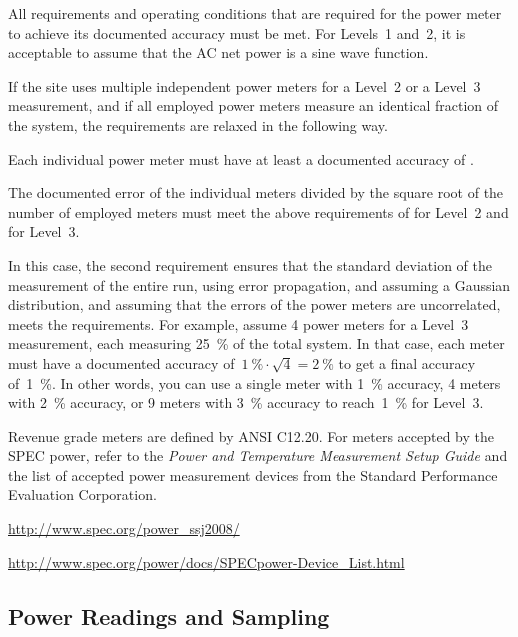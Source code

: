 All requirements and operating conditions that are required for the power meter to achieve its documented accuracy must be met.
For Levels~1 and~2, it is acceptable to assume that the AC net power is a sine wave function.

If the site uses multiple independent power meters for a Level~2 or a Level~3 measurement, and if all employed power meters measure an identical fraction of the system, the requirements are relaxed in the following way.
\begin{packed_item}
\item 
Each individual power meter must have at least a documented accuracy of \SpecAccuracyMeter{}.
\item
The documented error of the individual meters divided by the square root of the number of employed meters must meet the above requirements of \SpecAccuracyLTwo{} for Level~2 and \SpecAccuracyLThree{} for Level~3.
\end{packed_item}
In this case, the second requirement ensures that the standard deviation of the measurement of the entire run, using error propagation, and assuming a Gaussian distribution, and assuming that the errors of the power meters are uncorrelated, meets the requirements.
For example, assume 4 power meters for a Level~3 measurement, each measuring \SI{25}{\percent} of the total system.
In that case, each meter must have a documented accuracy of~$\SI{1}{\percent} \cdot \sqrt{4} = \SI{2}{\percent}$ to get a final accuracy of~\SI{1}{\percent}.
In other words, you can use a single meter with \SI{1}{\percent} accuracy, \num{4} meters with \SI{2}{\percent} accuracy, or \num{9} meters with \SI{3}{\percent} accuracy to reach~\SI{1}{\percent} for Level~3.

Revenue grade meters are defined by ANSI C12.20.
For meters accepted by the SPEC power, refer to the {\itshape Power and Temperature Measurement Setup Guide \/} and the list of accepted power measurement devices from the Standard Performance Evaluation Corporation.
\begin{packed_item}
\item 
\url{http://www.spec.org/power_ssj2008/}
\item
\url{http://www.spec.org/power/docs/SPECpower-Device_List.html }
\end{packed_item}

\subsection{Power Readings and Sampling}
\label{sec:PAaTEM}

